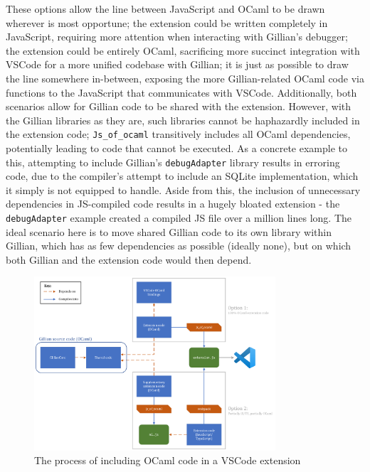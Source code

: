 These options allow the line between JavaScript and OCaml to be drawn wherever
is most opportune; the extension could be written completely in JavaScript,
requiring more attention when interacting with Gillian's debugger; the
extension could be entirely OCaml, sacrificing more succinct integration with
VSCode for a more unified codebase with Gillian; it is just as possible to draw
the line somewhere in-between, exposing the more Gillian-related OCaml code via
functions to the JavaScript that communicates with VSCode. Additionally, both
scenarios allow for Gillian code to be shared with the extension. However,
with the Gillian libraries as they are, such libraries cannot be haphazardly
included in the extension code; \texttt{Js\_of\_ocaml} transitively includes all
OCaml dependencies, potentially leading to code that cannot be executed. As a
concrete example to this, attempting to include Gillian's \texttt{debugAdapter}
library results in erroring code, due to the compiler's attempt to include an
SQLite implementation, which it simply is not equipped to handle. Aside from
this, the inclusion of unnecessary dependencies in JS-compiled code results in
a hugely bloated extension - the \texttt{debugAdapter} example created a
compiled JS file over a million lines long. The ideal scenario here is to move
shared Gillian code to its own library within Gillian, which has as few
dependencies as possible (ideally none), but on which both Gillian and the extension
code would then depend.

\begin{figure}
  \center
  \includegraphics[width=0.8\textwidth]{img/vscode-extension-with-ocaml.png}
  \caption{The process of including OCaml code in a VSCode extension}
  \label{fig:vscode-extension-with-ocaml}
\end{figure}

